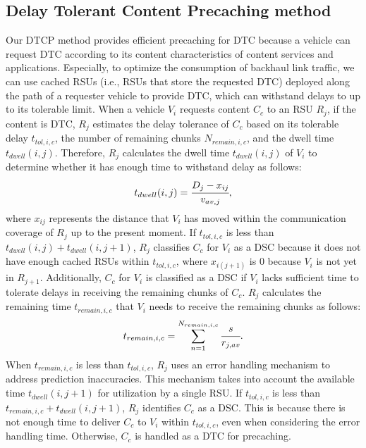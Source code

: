 \documentclass[journal]{IEEEtran}
\begin{document}
\subsection{Delay Tolerant Content Precaching method} \label{subsec3}
Our DTCP method provides efficient precaching for DTC because a vehicle can request DTC according to its content characteristics of content services and applications.
Especially, to optimize the consumption of backhaul link traffic, we can use cached RSUs (i.e., RSUs that store the requested DTC) deployed along the path of a requester vehicle to provide DTC, which can withstand delays to up to its tolerable limit.
When a vehicle $V_{i}$ requests content $C_{c}$ to an RSU $R_{j}$, if the content is DTC, $R_{j}$ estimates the delay tolerance of $C_{c}$ based on its tolerable delay $t_{tol, i, c}$, the number of remaining chunks $N_{remain, i, c}$, and the dwell time $t_{dwell}(i,j)$.
Therefore, $R_{j}$ calculates the dwell time $t_{dwell}(i,j)$ of $V_{i}$ to determine whether it has enough time to withstand delay as follows:
\begin{equation}
    t_{dwell}(i,j)=\cfrac{D_{j}-x_{ij}}{v_{av,j}},
\end{equation}
where $x_{ij}$ represents the distance that $V_{i}$ has moved within the communication coverage of $R_{j}$ up to the present moment.
If $t_{tol, i, c}$ is less than $t_{dwell}(i,j) + t_{dwell}(i,j+1)$, $R_{j}$ classifies $C_{c}$ for $V_{i}$ as a DSC because it does not have enough cached RSUs within $t_{tol, i, c}$, where $x_{i(j+1)}$ is 0 because $V_{i}$ is not yet in $R_{j+1}$.
Additionally, $C_{c}$ for $V_{i}$ is classified as a DSC if $V_{i}$ lacks sufficient time to tolerate delays in receiving the remaining chunks of $C_{c}$.
$R_{j}$ calculates the remaining time $t_{remain, i, c}$ that $V_{i}$ needs to receive the remaining chunks as follows:
\begin{equation}
    t_{remain, i, c} = \sum^{N_{remain, i, c}}_{n=1} \cfrac{s}{r_{j, av}}.
\end{equation}
When $t_{remain, i, c}$ is less than $t_{tol, i, c}$, $R_{j}$ uses an error handling mechanism to address prediction inaccuracies.
This mechanism takes into account the available time $t_{dwell}(i,j+1)$ for utilization by a single RSU.
If $t_{tol, i, c}$ is less than $t_{remain, i, c} + t_{dwell}(i,j+1)$, $R_{j}$ identifies $C_{c}$ as a DSC.
This is because there is not enough time to deliver $C_{c}$ to $V_{i}$ within $t_{tol, i, c}$, even when considering the error handling time.
Otherwise, $C_{c}$ is handled as a DTC for precaching.
\end{document}
